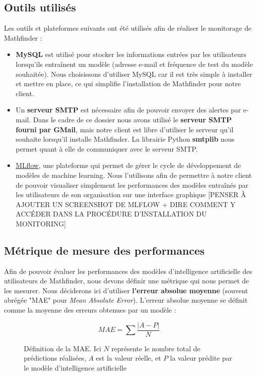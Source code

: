 \documentclass[french]{article}
\begin{document}
    \subsection{Outils utilisés}
    Les outils et plateformes suivants ont été utilisés afin de réaliser le monitorage de Mathfinder :
    \begin{itemize}
        \item \textbf{MySQL} est utilisé pour stocker les informations entrées par les utilisateurs lorsqu'ils entraînent un modèle (adresse e-mail et fréquence de test du modèle souhaitée). Nous choisissons d'utiliser MySQL car il est très simple à installer et mettre en place, ce qui simplifie l'installation de Mathfinder pour notre client.
        \item Un \textbf{serveur SMTP} est nécessaire afin de pouvoir envoyer des alertes par e-mail. Dans le cadre de ce dossier nous avons utilisé le \textbf{serveur SMTP fourni par GMail}, mais notre client est libre d'utiliser le serveur qu'il souhaite lorsqu'il installe Mathfinder. La librairie Python \textbf{smtplib} nous permet quant à elle de communiquer avec le serveur SMTP.
        \item \href{https://mlflow.org/}{MLflow}, une plateforme qui permet de gérer le cycle de développement de modèles de machine learning. Nous l'utilisons afin de permettre à notre client de pouvoir visualiser simplement les performances des modèles entraînés par les utilisateurs de son organisation sur une interface graphique
        [PENSER À AJOUTER UN SCREENSHOT DE MLFLOW + DIRE COMMENT Y ACCÉDER DANS LA PROCÉDURE D'INSTALLATION DU MONITORING]
    \end{itemize}
    \subsection{Métrique de mesure des performances}
    \label{sec:metrics}
    Afin de pouvoir évaluer les performances des modèles d'intelligence artificielle des utilisateurs de Mathfinder, nous devons définir une métrique qui nous permet de les mesurer. Nous déciderons ici d'utiliser \textbf{l'erreur absolue moyenne} (souvent abrégée "MAE" pour \textit{Mean Absolute Error}). L'erreur absolue moyenne se définit comme la moyenne des erreurs obtenues par un modèle :

    \begin{figure}[h!]
        \begin{equation}MAE = \sum \frac{\lvert A-P \rvert}{N}  \end{equation}
        \centering
        \caption{Définition de la MAE. Ici $N$ représente le nombre total de prédictions réalisées, $A$ est la valeur réelle, et $P$ la valeur prédite par le modèle d'intelligence artificielle}
        \centering
    \end{figure}
\end{document}
